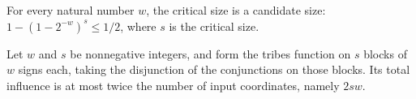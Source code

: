 \begin{theorem}
\label{FABL.tribesCriticalSize_spec}
\leanok
{}
For every natural number $w$, the critical size is a candidate size:
$1-(1-2^{-w})^{s}\le 1/2$, where $s$ is the critical size.
\end{theorem}

\begin{theorem}
\label{FABL.totalInfluence_tribes_le_two_mul_dimension}
\leanok
{}
Let $w$ and $s$ be nonnegative integers, and form the tribes function on $s$ blocks of
$w$ signs each, taking the disjunction of the conjunctions on those blocks. Its total
influence is at most twice the number of input coordinates, namely $2sw$.
\end{theorem}

